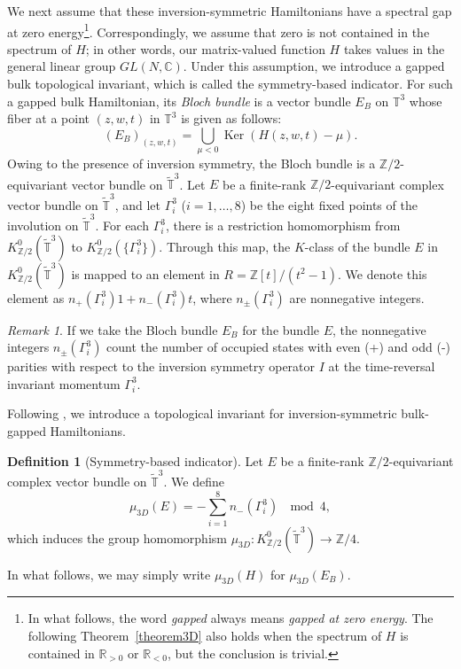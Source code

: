 \documentclass{amsart}
\theoremstyle{plain}
\theoremstyle{definition}
\newtheorem{definition}[theorem]{Definition}
\theoremstyle{remark}
\newtheorem{remark}[theorem]{Remark}
\newcommand{\Z}{\mathbb{Z}}
\newcommand{\R}{\mathbb{R}}
\newcommand{\C}{\mathbb{C}}
\newcommand{\T}{\mathbb{T}}
\newcommand{\tT}{\widetilde{\T}}
\newcommand{\Bloch}{E_B}
\DeclareMathOperator{\Ker}{\mathrm{Ker}}
\begin{document}
We next assume that these inversion-symmetric Hamiltonians have a spectral gap at zero energy\footnote{In what follows, the word {\em gapped} always means {\em gapped at zero energy}. The following Theorem~\ref{theorem3D} also holds when the spectrum of $H$ is contained in $\R_{>0}$ or $\R_{<0}$, but the conclusion is trivial.}.
Correspondingly, we assume that zero is not contained in the spectrum of $H$; in other words, our matrix-valued function $H$ takes values in the general linear group $GL(N,\C)$.
Under this assumption, we introduce a gapped bulk topological invariant, which is called the symmetry-based indicator.
For such a gapped bulk Hamiltonian, its {\em Bloch bundle} is a vector bundle $\Bloch$ on $\T^3$ whose fiber at a point $(z,w,t)$ in $\T^3$ is given as follows:
\begin{equation}
\label{Bloch}
	 (\Bloch)_{(z,w,t)} = \bigcup_{\mu < 0} \Ker (H(z,w,t) - \mu).
\end{equation}
Owing to the presence of inversion symmetry, the Bloch bundle is a $\Z/2$-equivariant vector bundle on $\tT^3$.
Let $E$ be a finite-rank $\Z/2$-equivariant complex vector bundle on $\tT^3$, and let $\Gamma^3_i$ ($i= 1,\ldots, 8$) be the eight fixed points of the involution on $\tT^3$.
For each $\Gamma^3_i$, there is a restriction homomorphism from $K^0_{\Z/2}(\tT^3)$ to $K^0_{\Z/2}(\{\Gamma^3_i\})$.
Through this map, the $K$-class of the bundle $E$ in $K^0_{\Z/2}(\tT^3)$ is mapped to an element in $R = \Z[t]/(t^2-1)$.
We denote this element as $n_+(\Gamma^3_i)1 + n_-(\Gamma^3_i)t$, where $n_\pm(\Gamma^3_i)$ are nonnegative integers.

\begin{remark}
\label{remark3.1}
If we take the Bloch bundle $\Bloch$ for the bundle $E$, the nonnegative integers $n_{\pm}(\Gamma^3_i)$ count the number of occupied states with even (+) and odd (-) parities with respect to the inversion symmetry operator $I$ at the time-reversal invariant momentum $\Gamma^3_i$.
\end{remark}

Following \cite{Po17,Khalaf18a,TTM20a}, we introduce a topological invariant for inversion-symmetric bulk-gapped Hamiltonians.
\begin{definition}[Symmetry-based indicator]
\label{defind3D}
Let $E$ be a finite-rank $\Z/2$-equivariant complex vector bundle on $\tT^3$.
We define
\begin{equation*}
	\mu_{3D}(E) = - \sum_{i=1}^8 n_-(\Gamma^3_i) \ \mod 4,
 \end{equation*}
which induces the group homomorphism $\mu_{3D} \colon K^0_{\Z/2}(\tT^3) \to \Z/4$.
\end{definition}
In what follows, we may simply write $\mu_{3D}(H)$ for $\mu_{3D}(\Bloch)$.
\end{document}
